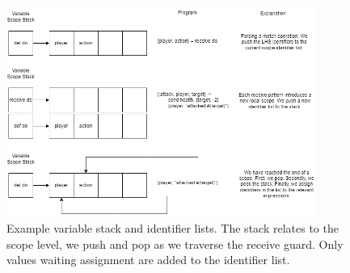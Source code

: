 \begin{figure}[h]
    \centering
    \includegraphics[width=0.9\textwidth]{images/var_stack.drawio.png}
    \caption{Example variable stack and identifier lists. The stack relates to the scope level, we push and pop as we traverse the receive guard. Only values waiting assignment are added to the identifier list.}
    \label{fig:scope_hierarchy2}
\end{figure}
